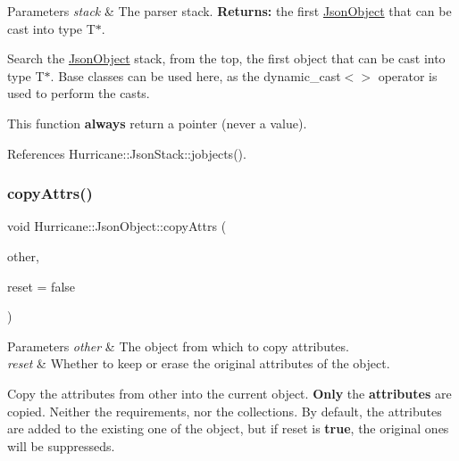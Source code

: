 \begin{DoxyParams}{Parameters}
{\em stack} & The parser stack. {\bfseries Returns\+:} the first \hyperlink{classHurricane_1_1JsonObject}{Json\+Object} that can be cast into type {\ttfamily T$\ast$}.\\
\hline
\end{DoxyParams}
Search the \hyperlink{classHurricane_1_1JsonObject}{Json\+Object} stack, from the top, the first object that can be cast into type {\ttfamily T$\ast$}. Base classes can be used here, as the {\ttfamily dynamic\+\_\+cast$<$$>$} operator is used to perform the casts.

This function {\bfseries always} return a pointer (never a value). 

References Hurricane\+::\+Json\+Stack\+::jobjects().

\mbox{\label{classHurricane_1_1JsonObject_a380ea9ac8689e1e9cad892edf0024c08}} 
\subsubsection{\texorpdfstring{copy\+Attrs()}{copyAttrs()}}
{\footnotesize\ttfamily void Hurricane\+::\+Json\+Object\+::copy\+Attrs (\begin{DoxyParamCaption}\item[{const \hyperlink{classHurricane_1_1JsonObject}{Json\+Object} $\ast$}]{other,  }\item[{bool}]{reset = {\ttfamily false} }\end{DoxyParamCaption})\hspace{0.3cm}{\ttfamily [inline]}}


\begin{DoxyParams}{Parameters}
{\em other} & The object from which to copy attributes. \\
\hline
{\em reset} & Whether to keep or erase the original attributes of the object.\\
\hline
\end{DoxyParams}
Copy the attributes from {\ttfamily other} into the current object. {\bfseries Only} the {\bfseries attributes} are copied. Neither the requirements, nor the collections. By default, the attributes are added to the existing one of the object, but if {\ttfamily reset} is {\bfseries true}, the original ones will be suppresseds. \mbox{\label{classHurricane_1_1JsonObject_a5f11139263926dbd8fe87b9c4480bdae}} 
